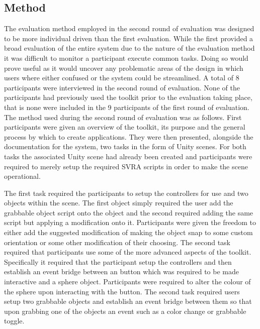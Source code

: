 \documentclass{l4proj}
\begin{document}
\subsection{Method}
\label{sec:evlauationmethod2}
The evaluation method employed in the second round of evaluation was designed to be more individual driven than the first evaluation. While the first provided a broad evaluation of the entire system due to the nature of the evaluation method it was difficult to monitor a participant execute common tasks. Doing so would prove useful as it would uncover any problematic areas of the design in which users where either confused or the system could be streamlined. A total of 8 participants were interviewed in the second round of evaluation. None of the participants had previously used the toolkit prior to the evaluation taking place, that is none were included in the 9 participants of the first round of evaluation. The method used during the second round of evaluation was as follows. First participants were given an overview of the toolkit, its purpose and the general process by which to create applications. They were then presented, alongside the documentation for the system, two tasks in the form of Unity scenes. For both tasks the associated Unity scene had already been created and participants were required to merely setup the required SVRA scripts in order to make the scene operational. 

The first task required the participants to setup the controllers for use and two objects within the scene. The first object simply required the user add the grabbable object script onto the object and the second required adding the same script but applying a modification onto it. Participants were given the freedom to either add the suggested modification of making the object snap to some custom orientation or some other modification of their choosing. The second task required that participants use some of the more advanced aspects of the toolkit. Specifically it required that the participant setup the controllers and then establish an event bridge between an button which was required to be made interactive and a sphere object. Participants were required to alter the colour of the sphere upon interacting with the button. The second task required users setup two grabbable objects and establish an event bridge between them so that upon grabbing one of the objects an event such as a color change or grabbable toggle.
\end{document}
